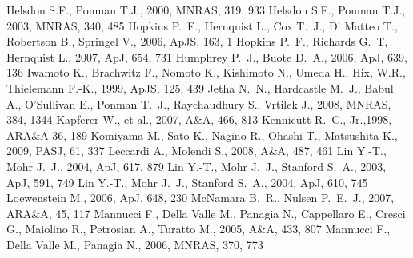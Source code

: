 \documentclass[useAMS,usenatbib]{mn2e}
\begin{document}
\begin{thebibliography}{}
   Helsdon S.F., Ponman T.J., 2000, MNRAS, 319, 933
   Helsdon S.F., Ponman T.J., 2003, MNRAS, 340, 485 
   Hopkins P.~F., Hernquist L., Cox T.~J., Di Matteo T., Robertson B., 
   Springel V., 2006, ApJS, 163, 1 
   Hopkins P.~F., Richards G.~T, Hernquist L., 2007, ApJ, 654, 731
   Humphrey P.~J., Buote D.~A., 2006, ApJ, 639, 136 
   Iwamoto K., Brachwitz F., Nomoto K., Kishimoto N., Umeda H., Hix, W.R., 
   Thielemann F.-K., 1999, ApJS, 125, 439 
   Jetha N.~N., Hardcastle M.~J., Babul A., O'Sullivan E., Ponman T.~J., 
   Raychaudhury S., Vrtilek J., 2008, MNRAS, 384, 1344 
   Kapferer W., et al., 2007, A\&A, 466, 813
   Kennicutt R.~C., Jr.,1998, ARA\&A 36, 189 
   Komiyama M., Sato K., Nagino R., Ohashi T., Matsushita K., 2009, PASJ, 61,
   337
   Leccardi A., Molendi S., 2008, A\&A, 487, 461 
   Lin Y.-T., Mohr J.~J., 2004, ApJ, 617, 879
   Lin Y.-T., Mohr J.~J., Stanford S.~A., 2003, ApJ, 591, 749 
   Lin Y.-T., Mohr J.~J., Stanford S.~A., 2004, ApJ, 610, 745 
   Loewenstein M., 2006, ApJ, 648, 230 
   McNamara B.~R., Nulsen P.~E.~J., 2007, ARA\&A, 45, 117 
   Mannucci F., Della Valle M., Panagia N., Cappellaro E., Cresci G., 
   Maiolino R., Petrosian A., Turatto M., 2005, A\&A, 433, 807 
   Mannucci F., Della Valle M., Panagia N., 2006, MNRAS, 370, 773 

\end{thebibliography}
\end{document}

